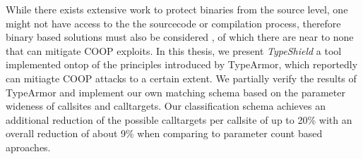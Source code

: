 While there exists extensive work to protect binaries from the source level, one might
not have access to the the sourcecode or compilation process, therefore binary based 
solutions must also be considered , of which there are near to none that can mitigate
COOP exploits. In this thesis, we present \textit{TypeShield} a tool implemented ontop
of the principles introduced by TypeArmor, which reportedly can mitiagte COOP attacks 
to a certain extent. We partially verify the results of TypeArmor and implement our
own matching schema based on the parameter wideness of callsites and calltargets. 
Our classification schema achieves an additional reduction of the possible calltargets
per callsite of up to 20\% with an overall reduction of about 9\% when comparing to 
parameter count based aproaches.
%
%
%
%
